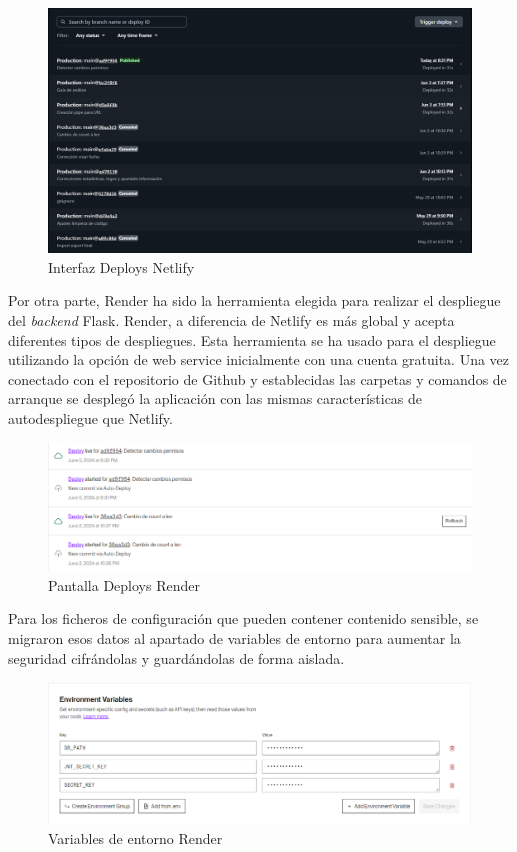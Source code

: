 \begin{figure}[h]
    \centering
    \includegraphics[width=1\linewidth]{Imagenes/Interfaz Netlify.png}
    \caption{Interfaz Deploys Netlify}
    \label{Interfaz Deploys Netlify}
\end{figure}
\FloatBarrier

Por otra parte, Render ha sido la herramienta elegida para realizar el despliegue del \textit{backend} Flask. Render, a diferencia de Netlify es más global y acepta diferentes tipos de despliegues. 
Esta herramienta se ha usado para el despliegue utilizando la opción de web service inicialmente con una cuenta gratuita. Una vez conectado con el repositorio de Github y establecidas las carpetas y comandos de arranque se desplegó la aplicación con las mismas características de autodespliegue que Netlify. 


\begin{figure}[h]
    \centering
    \includegraphics[width=0.9\linewidth]{Imagenes/DeploysRender.png}
    \caption{Pantalla Deploys Render}
    \label{Pantalla Deploys Render}
\end{figure}
\FloatBarrier


Para los ficheros de configuración que pueden contener contenido sensible, se migraron esos datos al apartado de variables de entorno para aumentar la seguridad cifrándolas y guardándolas de forma aislada.

\begin{figure}[h]
    \centering
    \includegraphics[width=0.9\linewidth]{Imagenes/RenderENV.png}
    \caption{Variables de entorno Render}
    \label{Variables de entorno Render}
\end{figure}
\FloatBarrier

